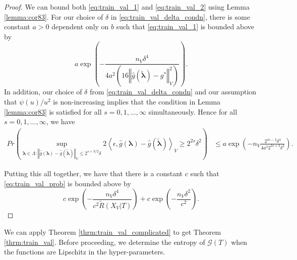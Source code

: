 \documentclass[10pt]{book}
\theoremstyle{definition}
\begin{document}
\begin{proof}
	We can bound both \eqref{eq:train_val_1} and \eqref{eq:train_val_2} using Lemma \ref{lemma:cor83}. For our choice of $\delta$ in \eqref{eq:train_val_delta_condn},
	there is some constant $a>0$ dependent only on $b$ such that \eqref{eq:train_val_1} is bounded above by
	\[ 
	a\exp\left(-\frac{n_{V}\delta^{4}}{4a^{2}\left(16\left\Vert \hat{g}(\tilde{\boldsymbol{\lambda}})-g^{*}\right\Vert _{V}^{2}\right)}\right).
	\]
	In addition, our choice of $\delta$ from \eqref{eq:train_val_delta_condn} and our assumption that $\psi(u)/u^2$ is non-increasing implies that the condition in Lemma \ref{lemma:cor83} is satisfied for all $s=0,1,...,\infty$ simultaneously. Hence for all $s=0,1,...,\infty$, we have
	\begin{align}
	Pr\left(
	\sup_{\boldsymbol{\lambda} \in \Lambda: \left\Vert \hat{g}({\boldsymbol{\lambda}})-\hat{g}(\tilde{\boldsymbol{\lambda}})\right\Vert _{V}
		\le
		2^{s+3/2}\delta}
	2\left\langle \epsilon,\hat{g}({\boldsymbol{\lambda}})-\hat{g}(\tilde{\boldsymbol{\lambda}})\right\rangle _{V}
	\ge
	2^{2s} \delta^{2}
	\right)
	& \le 
	a\exp\left(-n_{V}\frac{2^{4s-2}\delta^{4}}{4a^{2}2^{2s+3}\delta^{2}}\right).
	\end{align}
	
	Putting this all together, we have that there is a constant $c$ such that \eqref{eq:train_val_prob} is bounded above by
	\begin{equation}
	c\exp\left(-\frac{n_{V}\delta^{4}}{c^{2} \tilde{R}(X_V|T)}\right)
	+
	c\exp\left(-\frac{n_{V} \delta^2}{c^{2}}\right).
	\end{equation}
	
\end{proof}

We can apply Theorem \ref{thrm:train_val_complicated} to get Theorem \ref{thrm:train_val}. Before proceeding, we determine the entropy of $\mathcal{G}(T)$ when the functions are Lipschitz in the hyper-parameters.
\end{document}
